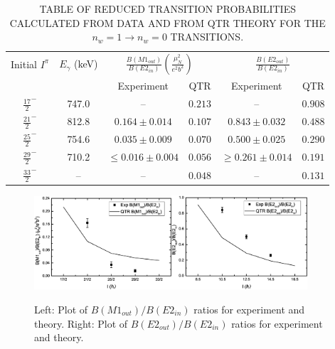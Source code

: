 \begin{table}
\begin{center}
\caption{TABLE OF REDUCED TRANSITION PROBABILITIES CALCULATED FROM DATA AND FROM QTR THEORY FOR THE $n_w=1 \rightarrow n_w=0$ TRANSITIONS.\label{tbl:chp4-transitition-ratios}}
\begin{tabular}{|c|c|c|c|c|c|}
\hline
Initial $I^\pi{}$ &$E_{\gamma}$ (keV) & \multicolumn{2}{c|}{ $\frac{B(M1_{out})}{B(E2_{in})}(\frac{\mu_N^2}{e^2b^2})$} & \multicolumn{2}{c|}{$\frac{B(E2_{out})}{B(E2_{in})}$} \\
& & Experiment & QTR & Experiment & QTR \\
\hline
$\frac{17}{2}^-$ & 747.0 & -- & $0.213$ & -- & $0.908$ \\
$\frac{21}{2}^-$ & 812.8 &  $0.164\pm0.014$ & $0.107$ &  $0.843\pm0.032$ & $0.488$ \\
$\frac{25}{2}^-$ & 754.6 &   $0.035\pm0.009$ & $0.070$ &  $0.500\pm0.025$ & $0.290$ \\
$\frac{29}{2}^-$ & 710.2 & $\leq0.016\pm0.004$ & $0.056$ & $\geq 0.261\pm0.014$ & $0.191$ \\
$\frac{33}{2}^-$ & -- & -- & $0.048$ & -- & $0.131$ \\
\bottomrule
\end{tabular}
\end{center}
\end{table}

\begin{figure}[th!]
\centerline{\includegraphics[width=0.455\textwidth]{./img/c4/m1_trans_prob.eps}\hspace{0.08\textwidth}\includegraphics[width=0.45\textwidth]{./img/c4/e2_trans_prob.eps}}
	\caption{Left: Plot of $B(M1_{out})/B(E2_{in})$ ratios for experiment and theory. Right: Plot of $B(E2_{out})/B(E2_{in})$ ratios for experiment and theory.\label{fig:chp4-trans-prob-ratios}}
\end{figure}

